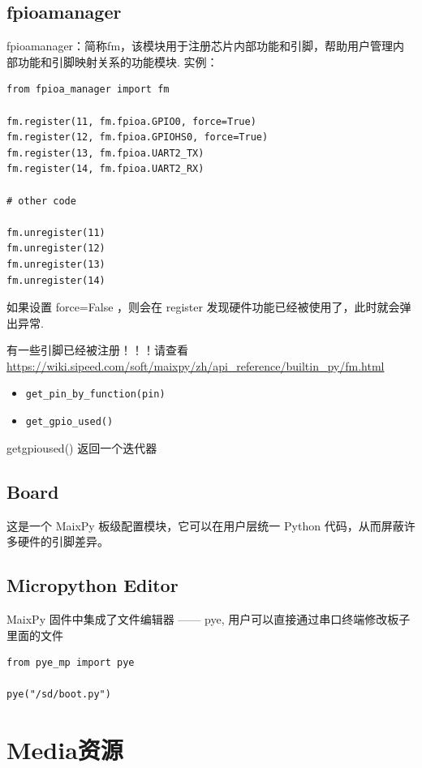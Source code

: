 \documentclass[UTF8]{ctexart}
\begin{document}
    \subsection{fpioa\textunderscore manager}
    fpioa\textunderscore manager：简称fm，该模块用于注册芯片内部功能和引脚，帮助用户管理内部功能和引脚映射关系的功能模块.
    实例：
    \begin{lstlisting}
from fpioa_manager import fm

fm.register(11, fm.fpioa.GPIO0, force=True)
fm.register(12, fm.fpioa.GPIOHS0, force=True)
fm.register(13, fm.fpioa.UART2_TX)
fm.register(14, fm.fpioa.UART2_RX)

# other code

fm.unregister(11)
fm.unregister(12)
fm.unregister(13)
fm.unregister(14)
    \end{lstlisting}
    如果设置 force=False ，则会在 register 发现硬件功能已经被使用了，此时就会弹出异常.
    \par
    有一些引脚已经被注册！！！请查看\url{https://wiki.sipeed.com/soft/maixpy/zh/api_reference/builtin_py/fm.html}
    \begin{itemize}
        \item \colorbox{mygrey}{\color{myred}\lstinline|get_pin_by_function(pin)|}
        \item \colorbox{mygrey}{\color{myred}\lstinline|get_gpio_used() |}
    \end{itemize}
    get\textunderscore gpio\textunderscore used() 返回一个迭代器
    \subsection{Board}
    这是一个 MaixPy 板级配置模块，它可以在用户层统一 Python 代码，从而屏蔽许多硬件的引脚差异。
    \subsection{Micropython Editor}
    MaixPy 固件中集成了文件编辑器 —— pye, 用户可以直接通过串口终端修改板子里面的文件
    \begin{lstlisting}
from pye_mp import pye

pye("/sd/boot.py")
    \end{lstlisting}

    \section{Media资源}
\end{document}
